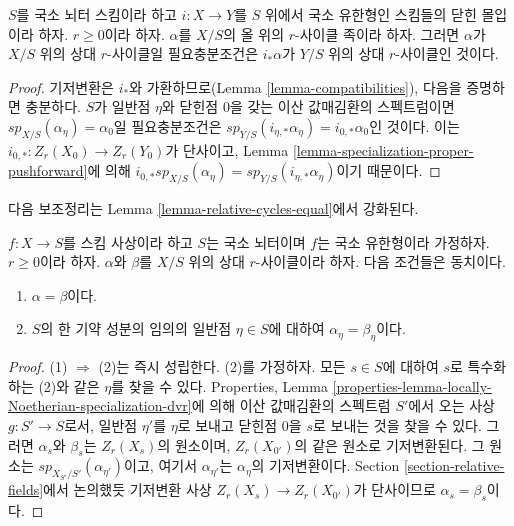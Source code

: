 \begin{lemma}
\label{lemma-check-after-closed}
$S$를 국소 뇌터 스킴이라 하고 $i : X \to Y$를 $S$ 위에서 국소
유한형인 스킴들의 닫힌 몰입이라 하자. $r \geq 0$이라 하자.
$\alpha$를 $X/S$의 올 위의 $r$-사이클 족이라 하자. 그러면
$\alpha$가 $X/S$ 위의 상대 $r$-사이클일 필요충분조건은
$i_*\alpha$가 $Y/S$ 위의 상대 $r$-사이클인 것이다.
\end{lemma}

\begin{proof}
기저변환은 $i_*$와 가환하므로(Lemma \ref{lemma-compatibilities}),
다음을 증명하면 충분하다. $S$가 일반점 $\eta$와 닫힌점 $0$을 갖는
이산 값매김환의 스펙트럼이면
$sp_{X/S}(\alpha_\eta) = \alpha_0$일 필요충분조건은
$sp_{Y/S}(i_{\eta, *}\alpha_\eta) = i_{0, *}\alpha_0$인 것이다.
이는 $i_{0, *} : Z_r(X_0) \to Z_r(Y_0)$가 단사이고,
Lemma \ref{lemma-specialization-proper-pushforward}에 의해
$i_{0, *}sp_{X/S}(\alpha_\eta) =
sp_{Y/S}(i_{\eta, *}\alpha_\eta)$이기 때문이다.
\end{proof}

\noindent
다음 보조정리는 Lemma \ref{lemma-relative-cycles-equal}에서 강화된다.

\begin{lemma}
\label{lemma-uniqueness-extension}
$f : X \to S$를 스킴 사상이라 하고 $S$는 국소 뇌터이며 $f$는
국소 유한형이라 가정하자. $r \geq 0$이라 하자. $\alpha$와 $\beta$를
$X/S$ 위의 상대 $r$-사이클이라 하자. 다음 조건들은 동치이다.
\begin{enumerate}
\item $\alpha = \beta$이다.
\item $S$의 한 기약 성분의 임의의 일반점 $\eta \in S$에 대하여
$\alpha_\eta = \beta_\eta$이다.
\end{enumerate}
\end{lemma}

\begin{proof}
(1) $\Rightarrow$ (2)는 즉시 성립한다. (2)를 가정하자. 모든
$s \in S$에 대하여 $s$로 특수화하는 (2)와 같은 $\eta$를 찾을 수
있다. Properties, Lemma
\ref{properties-lemma-locally-Noetherian-specialization-dvr}에 의해
이산 값매김환의 스펙트럼 $S'$에서 오는 사상 $g : S' \to S$로서,
일반점 $\eta'$를 $\eta$로 보내고 닫힌점 $0$을 $s$로 보내는 것을
찾을 수 있다. 그러면 $\alpha_s$와 $\beta_s$는 $Z_r(X_s)$의 원소이며,
$Z_r(X_{0'})$의 같은 원소로 기저변환된다. 그 원소는
$sp_{X_{S'}/S'}(\alpha_{\eta'})$이고, 여기서 $\alpha_{\eta'}$는
$\alpha_\eta$의 기저변환이다. Section \ref{section-relative-fields}에서
논의했듯 기저변환 사상 $Z_r(X_s) \to Z_r(X_{0'})$가 단사이므로
$\alpha_s = \beta_s$이다.
\end{proof}

